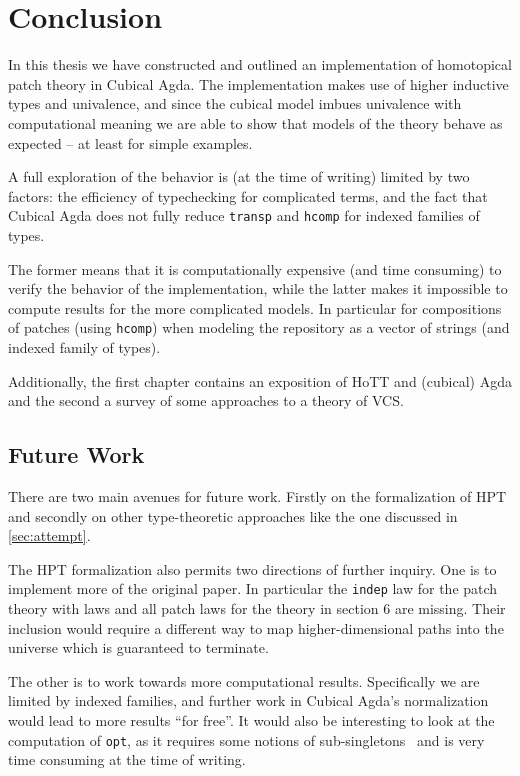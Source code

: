 \chapter{Conclusion}\label{ch/conclusion}

In this thesis we have constructed and outlined an implementation of homotopical
patch theory in Cubical Agda. The implementation makes use of higher inductive
types and univalence, and since the cubical model imbues univalence with
computational meaning we are able to show that models of the theory behave as
expected -- at least for simple examples.

A full exploration of the behavior is (at the time of writing) limited by two
factors: the efficiency of typechecking for complicated terms, and the fact that
Cubical Agda does not fully reduce \texttt{transp} and \texttt{hcomp} for
indexed families of types.

The former means that it is computationally expensive (and time consuming) to
verify the behavior of the implementation, while the latter makes it impossible
to compute results for the more complicated models. In particular for
compositions of patches (using \texttt{hcomp}) when modeling the repository as a
vector of strings (and indexed family of types).

Additionally, the first chapter contains an exposition of HoTT and (cubical)
Agda and the second a survey of some approaches to a theory of VCS.

\section{Future Work}

There are two main avenues for future work. Firstly on the formalization of HPT
and secondly on other type-theoretic approaches like the one discussed in
\autoref{sec:attempt}.

The HPT formalization also permits two directions of further inquiry. One is to
implement more of the original paper. In particular the \texttt{indep} law for
the patch theory with laws and all patch laws for the theory in section 6 are
missing. Their inclusion would require a different way to map higher-dimensional
paths into the universe which is guaranteed to terminate.

The other is to work towards more computational results.
Specifically we are limited by indexed families, and further work in Cubical
Agda's normalization would lead to more results ``for free''. It would also be
interesting to look at the computation of \texttt{opt}, as it requires some
notions of sub-singletons~\cite{Angiuli2016} and is very time consuming at the
time of writing.

